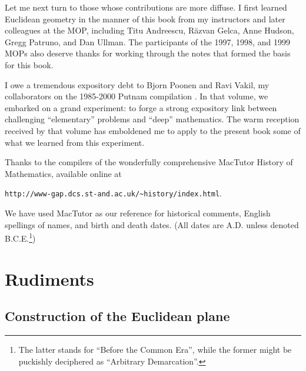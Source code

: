 \documentclass[12pt]{book}
\numberwithin{exc}{section}
\numberwithin{figure}{section}
\numberwithin{equation}{theorem}
\begin{document}
Let me next turn to those whose contributions are more diffuse.
I first learned Euclidean geometry in the manner of this book
from my instructors and later colleagues at the MOP, including
Titu Andreescu,  R\u{a}zvan Gelca,
Anne Hudson, 
Gregg Patruno, 
and Dan Ullman. 
The participants
of the 1997, 1998, and 1999 MOPs also deserve thanks for working through
the notes that formed the basis for this book.

I owe a tremendous expository debt to Bjorn Poonen 
and Ravi Vakil, 
my collaborators on the 1985-2000 Putnam compilation
\cite{bib:putnam}. In that volume,
we embarked on a grand experiment: to
forge a strong expository link between challenging ``elementary''
problems and ``deep'' mathematics. The warm reception received by that
volume has emboldened me to apply to the present book
some of what we learned from this experiment.

Thanks to the compilers of the wonderfully comprehensive
MacTutor History of Mathematics,  available 
online at
\begin{center}
\texttt{http://www-gap.dcs.st-and.ac.uk/\~{}history/index.html}.
\end{center}
We have used MacTutor as our reference for historical comments, English spellings of names, and birth and death dates. (All dates are A.D. 
unless denoted B.C.E.\footnote{The latter stands for ``Before the Common
Era'', while the former might be puckishly deciphered as
``Arbitrary Demarcation''.}) 

\newpage
{}
\part{Rudiments}

\setcounter{secnumdepth}{1}
\chapter{Construction of the Euclidean plane}
\end{document}
